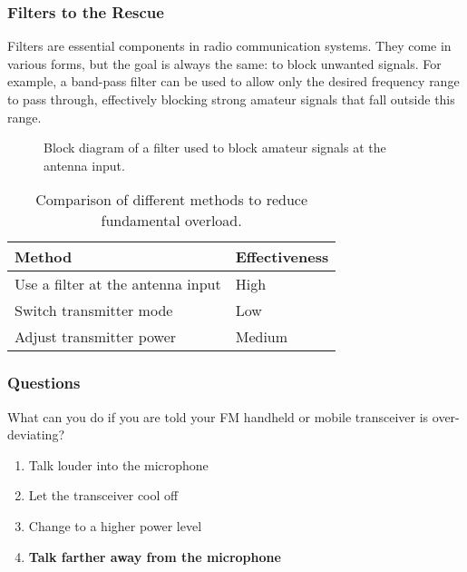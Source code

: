 \subsubsection*{Filters to the Rescue}

Filters are essential components in radio communication systems. They come in various forms, but the goal is always the same: to block unwanted signals. For example, a band-pass filter can be used to allow only the desired frequency range to pass through, effectively blocking strong amateur signals that fall outside this range. 

\begin{figure}[h]
    \centering
    \caption{Block diagram of a filter used to block amateur signals at the antenna input.}
    \label{fig:filter-block}
\end{figure}

\begin{table}[h]
    \centering
    \begin{tabular}{|l|l|}
    \hline
    \textbf{Method} & \textbf{Effectiveness} \\ \hline
    Use a filter at the antenna input & High \\ \hline
    Switch transmitter mode & Low \\ \hline
    Adjust transmitter power & Medium \\ \hline
    \end{tabular}
    \caption{Comparison of different methods to reduce fundamental overload.}
    \label{tab:overload-methods}
\end{table}

\subsubsection*{Questions}

\begin{tcolorbox}[colback=gray!10!white,colframe=black!75!black,title={T7B01}]
    What can you do if you are told your FM handheld or mobile transceiver is over-deviating?
    \begin{enumerate}[label=\Alph*),noitemsep]
        \item Talk louder into the microphone
        \item Let the transceiver cool off
        \item Change to a higher power level
        \item \textbf{Talk farther away from the microphone}
    \end{enumerate}
\end{tcolorbox}


